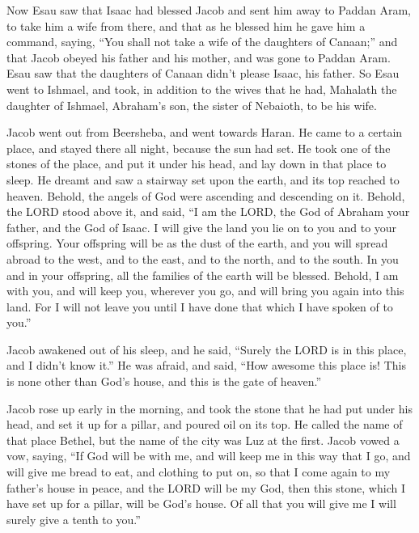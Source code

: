  Now Esau saw that Isaac had blessed Jacob and sent him
away to Paddan Aram, to take him a wife from there, and that as he
blessed him he gave him a command, saying, ``You shall not take a wife
of the daughters of Canaan;''  and that Jacob obeyed his
father and his mother, and was gone to Paddan Aram.  Esau
saw that the daughters of Canaan didn't please Isaac, his father.
 So Esau went to Ishmael, and took, in addition to the
wives that he had, Mahalath the daughter of Ishmael, Abraham's son, the
sister of Nebaioth, to be his wife.

 Jacob went out from Beersheba, and went towards Haran.
 He came to a certain place, and stayed there all night,
because the sun had set. He took one of the stones of the place, and put
it under his head, and lay down in that place to sleep. 
He dreamt and saw a stairway set upon the earth, and its top reached to
heaven. Behold, the angels of God were ascending and descending on it.
 Behold, the LORD stood above it, and said, ``I am the
LORD, the God of Abraham your father, and the God of Isaac. I will give
the land you lie on to you and to your offspring.  Your
offspring will be as the dust of the earth, and you will spread abroad
to the west, and to the east, and to the north, and to the south. In you
and in your offspring, all the families of the earth will be blessed.
 Behold, I am with you, and will keep you, wherever you
go, and will bring you again into this land. For I will not leave you
until I have done that which I have spoken of to you.''

 Jacob awakened out of his sleep, and he said, ``Surely
the LORD is in this place, and I didn't know it.''  He
was afraid, and said, ``How awesome this place is! This is none other
than God's house, and this is the gate of heaven.''

 Jacob rose up early in the morning, and took the stone
that he had put under his head, and set it up for a pillar, and poured
oil on its top.  He called the name of that place Bethel,
but the name of the city was Luz at the first.  Jacob
vowed a vow, saying, ``If God will be with me, and will keep me in this
way that I go, and will give me bread to eat, and clothing to put on,
 so that I come again to my father's house in peace, and
the LORD will be my God,  then this stone, which I have
set up for a pillar, will be God's house. Of all that you will give me I
will surely give a tenth to you.''

